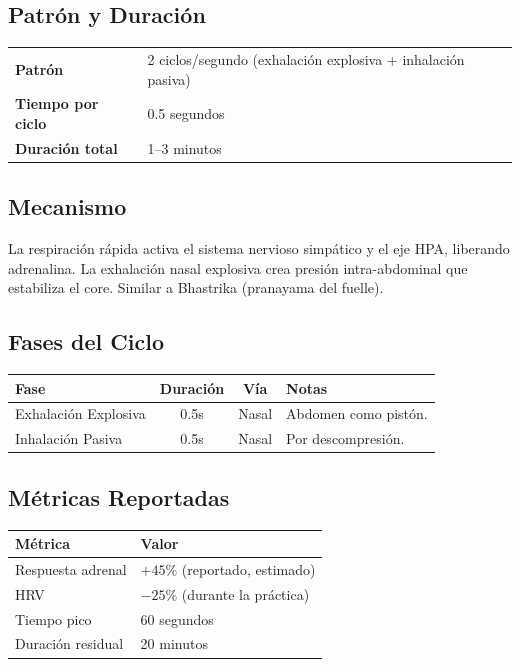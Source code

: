 \documentclass[12pt,a4paper]{article}
\begin{document}
\subsection*{Patrón y Duración}
\begin{tabularx}{\textwidth}{lX}
    \textbf{Patrón} & 2 ciclos/segundo (exhalación explosiva + inhalación pasiva) \\
    \textbf{Tiempo por ciclo} & 0.5 segundos \\
    \textbf{Duración total} & 1--3 minutos \\
\end{tabularx}

\subsection*{Mecanismo}
La respiración rápida activa el sistema nervioso simpático y el eje HPA,
liberando adrenalina. La exhalación nasal explosiva crea presión intra-abdominal
que estabiliza el core. Similar a Bhastrika (pranayama del fuelle).

\subsection*{Fases del Ciclo}
\begin{tabularx}{\textwidth}{lccX}
    \toprule
    \textbf{Fase} & \textbf{Duración} & \textbf{Vía} & \textbf{Notas} \\
    \midrule
    Exhalación Explosiva & 0.5s & Nasal & Abdomen como pistón. \\
    Inhalación Pasiva & 0.5s & Nasal & Por descompresión. \\
    \bottomrule
\end{tabularx}

\subsection*{Métricas Reportadas}
\begin{tabularx}{\textwidth}{lX}
    \toprule
    \textbf{Métrica} & \textbf{Valor} \\
    \midrule
    Respuesta adrenal & $+45\%$ (reportado, estimado) \\
    HRV & $-25\%$ (durante la práctica) \\
    Tiempo pico & 60 segundos \\
    Duración residual & 20 minutos \\
    \bottomrule
\end{tabularx}
\end{document}
